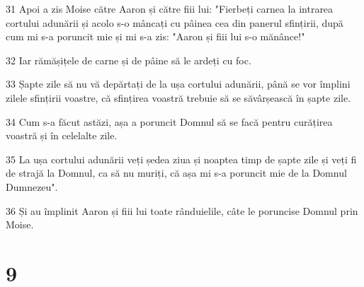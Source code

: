 \par 31 Apoi a zis Moise către Aaron și către fiii lui: "Fierbeți carnea la intrarea cortului adunării și acolo s-o mâncați cu pâinea cea din panerul sfințirii, după cum mi s-a poruncit mie și mi s-a zis: "Aaron și fiii lui s-o mănânce!"
\par 32 Iar rămășițele de carne și de pâine să le ardeți cu foc.
\par 33 Șapte zile să nu vă depărtați de la ușa cortului adunării, până se vor împlini zilele sfințirii voastre, că sfințirea voastră trebuie să se săvârșească în șapte zile.
\par 34 Cum s-a făcut astăzi, așa a poruncit Domnul să se facă pentru curățirea voastră și în celelalte zile.
\par 35 La ușa cortului adunării veți ședea ziua și noaptea timp de șapte zile și veți fi de strajă la Domnul, ca să nu muriți, că așa mi s-a poruncit mie de la Domnul Dumnezeu".
\par 36 Și au împlinit Aaron și fiii lui toate rânduielile, câte le poruncise Domnul prin Moise.

\chapter{9}

